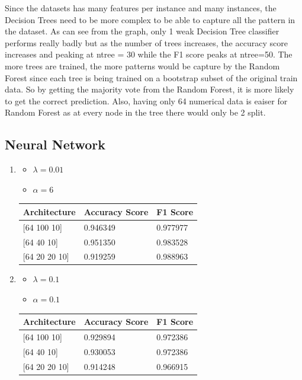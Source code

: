 \documentclass[letterpaper]{article}
\begin{document}
Since the datasets has many features per instance and many instances, the Decision Trees need to be more complex to be able to capture all the pattern
in the dataset. As can see from the graph, only 1 weak Decision Tree classifier performs really badly but as the number of trees increases, the accuracy
score increases and peaking at ntree = 30 while the F1 score peaks at ntree=50. The more trees are trained, the more patterns would be capture by the Random Forest since each tree
is being trained on a bootstrap subset of the original train data. So by getting the majority vote from the Random Forest, it is more likely to get
the correct prediction. Also, having only 64 numerical data is eaiser for Random Forest as at every node in the tree there would only be 2 split.

\subsection*{Neural Network}
\begin{enumerate}[label=(\alph*)]
	\item \begin{itemize}
		      \item $\lambda = 0.01$
		      \item $\alpha = 6$
	      \end{itemize}

	      \begin{table}[H]
		      \centering
		      \begin{tabular}{|l|l|l|}
			      \hline
			      Architecture      & Accuracy Score & F1 Score \\ \hline
			      {[}64 100 10{]}   & 0.946349       & 0.977977 \\ \hline
			      {[}64 40 10{]}    & 0.951350       & 0.983528 \\ \hline
			      {[}64 20 20 10{]} & 0.919259       & 0.988963 \\ \hline
		      \end{tabular}
	      \end{table}
	\item \begin{itemize}
		      \item $\lambda = 0.1$
		      \item $\alpha = 0.1$
	      \end{itemize}

	      \begin{table}[H]
		      \centering
		      \begin{tabular}{|l|l|l|}
			      \hline
			      Architecture      & Accuracy Score & F1 Score \\ \hline
			      {[}64 100 10{]}   & 0.929894       & 0.972386 \\ \hline
			      {[}64 40 10{]}    & 0.930053       & 0.972386 \\ \hline
			      {[}64 20 20 10{]} & 0.914248       & 0.966915 \\ \hline
		      \end{tabular}
	      \end{table}
\end{enumerate}
\end{document}
